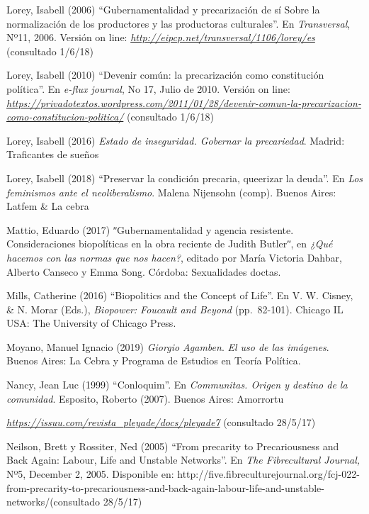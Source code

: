 \documentclass[a4paper,]{scrartcl}
\begin{document}
Lorey, Isabell (2006) ``Gubernamentalidad y precarización de sí Sobre la
normalización de los productores y las productoras culturales''. En
\emph{Transversal}, Nº11, 2006. Versión on line:
\href{http://eipcp.net/transversal/1106/lorey/es}{\emph{http://eipcp.net/transversal/1106/lorey/es}}
(consultado 1/6/18)

Lorey, Isabell (2010) ``Devenir común: la precarización como
constitución política''. En \emph{e-flux journal}, No 17, Julio de 2010.
Versión on line:
\href{https://privadotextos.wordpress.com/2011/01/28/devenir-comun-la-precarizacion-como-constitucion-politica/}{\emph{https://privadotextos.wordpress.com/2011/01/28/devenir-comun-la-precarizacion-como-constitucion-politica/}}
(consultado 1/6/18)

Lorey, Isabell (2016) \emph{Estado de inseguridad. Gobernar la
precariedad}. Madrid: Traficantes de sueños

Lorey, Isabell (2018) ``Preservar la condición precaria, queerizar la
deuda''. En \emph{Los feminismos ante el neoliberalismo}. Malena
Nijensohn (comp). Buenos Aires: Latfem \& La cebra

Mattio, Eduardo (2017) ʺGubernamentalidad y agencia resistente.
Consideraciones biopolíticas en la obra reciente de Judith Butlerʺ, en
\emph{¿Qué hacemos con las normas que nos hacen?}, editado por María
Victoria Dahbar, Alberto Canseco y Emma Song. Córdoba: Sexualidades
doctas.

Mills, Catherine (2016) ``Biopolitics and the Concept of Life''. En V.
W. Cisney, \& N. Morar (Eds.), \emph{Biopower: Foucault and Beyond}
(pp.~82-101). Chicago IL USA: The University of Chicago Press.

Moyano, Manuel Ignacio (2019) \emph{Giorgio Agamben}. \emph{El uso de
las imágenes}. Buenos Aires: La Cebra y Programa de Estudios en Teoría
Política.

Nancy, Jean Luc (1999) ``Conloquim''. En \emph{Communitas. Origen y
destino de la comunidad}. Esposito, Roberto (2007). Buenos Aires:
Amorrortu

\href{https://issuu.com/revista_pleyade/docs/pleyade7}{\emph{https://issuu.com/revista\_pleyade/docs/pleyade7}}
(consultado 28/5/17)

Neilson, Brett y Rossiter, Ned (2005) ``From precarity to Precariousness
and Back Again: Labour, Life and Unstable Networks''. En \emph{The
Fibrecultural Journal,} Nº5, December 2, 2005. Disponible en:
http://five.fibreculturejournal.org/fcj-022-from-precarity-to-precariousness-and-back-again-labour-life-and-unstable-networks/(consultado
28/5/17)
\end{document}
